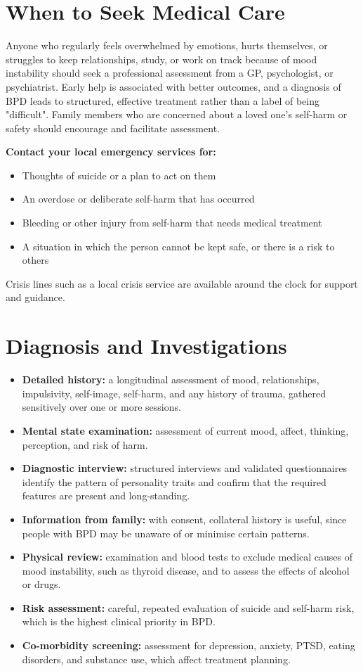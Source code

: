 \section*{When to Seek Medical Care}
Anyone who regularly feels overwhelmed by emotions, hurts themselves, or struggles to keep relationships, study, or work on track because of mood instability should seek a professional assessment from a GP, psychologist, or psychiatrist. Early help is associated with better outcomes, and a diagnosis of BPD leads to structured, effective treatment rather than a label of being "difficult". Family members who are concerned about a loved one's self-harm or safety should encourage and facilitate assessment.

\textbf{Contact your local emergency services for:}
\begin{itemize}
    \item Thoughts of suicide or a plan to act on them
    \item An overdose or deliberate self-harm that has occurred
    \item Bleeding or other injury from self-harm that needs medical treatment
    \item A situation in which the person cannot be kept safe, or there is a risk to others
\end{itemize}
Crisis lines such as a local crisis service are available around the clock for support and guidance.

\section*{Diagnosis and Investigations}
\begin{itemize}
    \item \textbf{Detailed history:} a longitudinal assessment of mood, relationships, impulsivity, self-image, self-harm, and any history of trauma, gathered sensitively over one or more sessions.
    \item \textbf{Mental state examination:} assessment of current mood, affect, thinking, perception, and risk of harm.
    \item \textbf{Diagnostic interview:} structured interviews and validated questionnaires identify the pattern of personality traits and confirm that the required features are present and long-standing.
    \item \textbf{Information from family:} with consent, collateral history is useful, since people with BPD may be unaware of or minimise certain patterns.
    \item \textbf{Physical review:} examination and blood tests to exclude medical causes of mood instability, such as thyroid disease, and to assess the effects of alcohol or drugs.
    \item \textbf{Risk assessment:} careful, repeated evaluation of suicide and self-harm risk, which is the highest clinical priority in BPD.
    \item \textbf{Co-morbidity screening:} assessment for depression, anxiety, PTSD, eating disorders, and substance use, which affect treatment planning.
\end{itemize}

